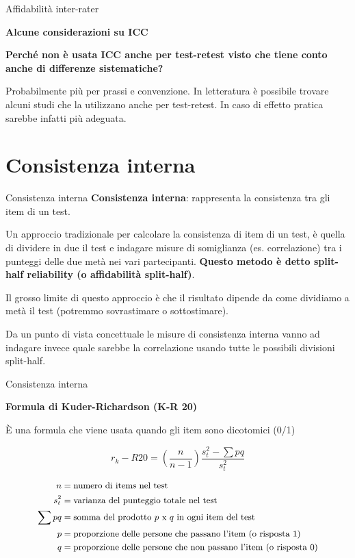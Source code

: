 \documentclass[
  ignorenonframetext,
]{beamer}
\begin{document}
\begin{frame}{Affidabilità inter-rater}
\label{affidabilituxe0-inter-rater-4}
\begin{center}
  \textbf{Alcune considerazioni su ICC}
\end{center}

\textbf{Perché non è usata ICC anche per test-retest visto che tiene
conto anche di differenze sistematiche?}

Probabilmente più per prassi e convenzione. In letteratura è possibile
trovare alcuni studi che la utilizzano anche per test-retest. In caso di
effetto pratica sarebbe infatti più adeguata.
\end{frame}

\section{Consistenza interna}\label{consistenza-interna}

\begin{frame}{Consistenza interna}
\label{consistenza-interna-1}
\textbf{Consistenza interna}: rappresenta la consistenza tra gli item di
un test.

Un approccio tradizionale per calcolare la consistenza di item di un
test, è quella di dividere in due il test e indagare misure di
somiglianza (es. correlazione) tra i punteggi delle due metà nei vari
partecipanti. \textbf{Questo metodo è detto split-half reliability (o
affidabilità split-half)}.

Il grosso limite di questo approccio è che il risultato dipende da come
dividiamo a metà il test (potremmo sovrastimare o sottostimare).

Da un punto di vista concettuale le misure di consistenza interna vanno
ad indagare invece quale sarebbe la correlazione usando tutte le
possibili divisioni split-half.
\end{frame}

\begin{frame}{Consistenza interna}
\label{consistenza-interna-2}
\begin{center}
  \textbf{Formula di Kuder-Richardson (K-R 20)}
\end{center}

È una formula che viene usata quando gli item sono dicotomici (0/1)

\[
r_k-R20 = (\frac{n}{n-1})\frac{s_t^2 - \sum{pq}}{s_t^2}
\]

\[
\small
\begin{aligned}
n & = \text{numero di items nel test} \\
s_t^2 & = \text{varianza del punteggio totale nel test} \\
\sum{pq} & = \text{somma del prodotto $p$ x $q$ in ogni item del test} \\
p & = \text{proporzione delle persone che passano l’item (o risposta 1)} \\
q & = \text{proporzione delle persone che non passano l’item (o risposta 0)}
\end{aligned}
\]
\end{frame}
\end{document}
